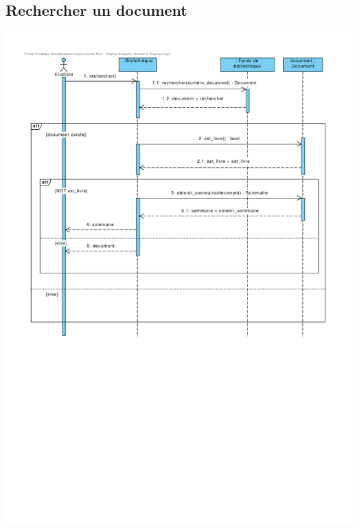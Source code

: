 \documentclass{article}
\begin{document}
\subsection{Rechercher un document}
\vspace{-4em}
\hspace*{-9em}\includegraphics[scale=1.5]{sequence_rechercher_un_document}
\vspace*{-4em}
\end{document}
